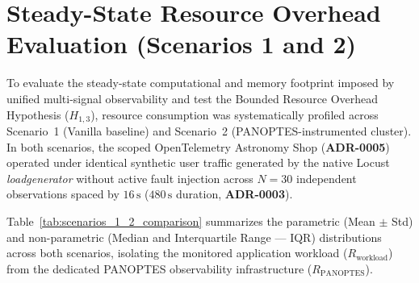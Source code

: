 \section{Steady-State Resource Overhead Evaluation (Scenarios 1 and 2)}
\label{sec:steady-state-overhead-results}

To evaluate the steady-state computational and memory footprint imposed by unified multi-signal observability and test the Bounded Resource Overhead Hypothesis ($H_{1,3}$), resource consumption was systematically profiled across Scenario~1 (Vanilla baseline) and Scenario~2 (PANOPTES-instrumented cluster). In both scenarios, the scoped OpenTelemetry Astronomy Shop (\textbf{ADR-0005}) operated under identical synthetic user traffic generated by the native Locust \textit{loadgenerator} without active fault injection across $N=30$ independent observations spaced by $16\,\text{s}$ ($480\,\text{s}$ duration, \textbf{ADR-0003}).

Table~\ref{tab:scenarios_1_2_comparison} summarizes the parametric (Mean $\pm$ Std) and non-parametric (Median and Interquartile Range --- IQR) distributions across both scenarios, isolating the monitored application workload ($R_{\text{workload}}$) from the dedicated PANOPTES observability infrastructure ($R_{\text{PANOPTES}}$).




